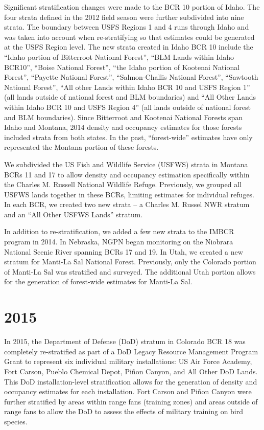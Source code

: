 \documentclass[
  letterpaper,
  DIV=11,
  numbers=noendperiod,
  oneside]{scrreprt}
\begin{document}
Significant stratification changes were made to the BCR 10 portion of
Idaho. The four strata defined in the 2012 field season were further
subdivided into nine strata. The boundary between USFS Regions 1 and 4
runs through Idaho and was taken into account when re-stratifying so
that estimates could be generated at the USFS Region level. The new
strata created in Idaho BCR 10 include the ``Idaho portion of Bitterroot
National Forest'', ``BLM Lands within Idaho BCR10'', ``Boise National
Forest'', ``the Idaho portion of Kootenai National Forest'', ``Payette
National Forest'', ``Salmon-Challis National Forest'', ``Sawtooth
National Forest'', ``All other Lands within Idaho BCR 10 and USFS Region
1'' (all lands outside of national forest and BLM boundaries) and ``All
Other Lands within Idaho BCR 10 and USFS Region 4'' (all lands outside
of national forest and BLM boundaries). Since Bitterroot and Kootenai
National Forests span Idaho and Montana, 2014 density and occupancy
estimates for those forests included strata from both states. In the
past, ``forest-wide'' estimates have only represented the Montana
portion of these forests.

We subdivided the US Fish and Wildlife Service (USFWS) strata in Montana
BCRs 11 and 17 to allow density and occupancy estimation specifically
within the Charles M. Russell National Wildlife Refuge. Previously, we
grouped all USFWS lands together in these BCRs, limiting estimates for
individual refuges. In each BCR, we created two new strata -- a Charles
M. Russel NWR stratum and an ``All Other USFWS Lands'' stratum.

In addition to re-stratification, we added a few new strata to the IMBCR
program in 2014. In Nebraska, NGPN began monitoring on the Niobrara
National Scenic River spanning BCRs 17 and 19. In Utah, we created a new
stratum for Manti-La Sal National Forest. Previously, only the Colorado
portion of Manti-La Sal was stratified and surveyed. The additional Utah
portion allows for the generation of forest-wide estimates for Manti-La
Sal.

\hypertarget{section-6}{%
\section*{\texorpdfstring{\textbf{2015}}{2015}}\label{section-6}}


In 2015, the Department of Defense (DoD) stratum in Colorado BCR 18 was
completely re-stratified as part of a DoD Legacy Resource Management
Program Grant to represent six individual military installations: US Air
Force Academy, Fort Carson, Pueblo Chemical Depot, Piñon Canyon, and All
Other DoD Lands. This DoD installation-level stratification allows for
the generation of density and occupancy estimates for each installation.
Fort Carson and Piñon Canyon were further stratified by areas within
range fans (training zones) and areas outside of range fans to allow the
DoD to assess the effects of military training on bird species.
\end{document}
